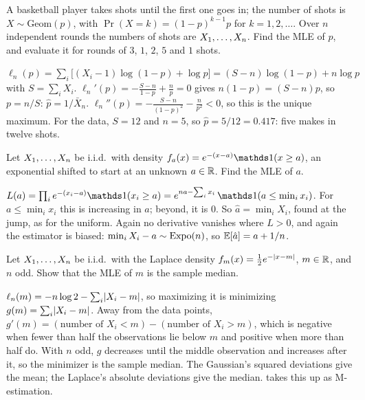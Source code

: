 \begin{exercise}
\label{ex:lik-geometric}
A basketball player takes shots until the first one goes in; the number of shots is $X \sim \text{Geom}(p)$, with $\Pr(X = k) = (1 - p)^{k-1}p$ for $k = 1, 2, \ldots$. Over $n$ independent rounds the numbers of shots are $X_1, \ldots, X_n$. Find the MLE of $p$, and evaluate it for rounds of $3$, $1$, $2$, $5$ and $1$ shots.
\end{exercise}
\begin{solution}
$\ell_n(p) = \sum_i\big[(X_i - 1)\log(1 - p) + \log p\big] = (S - n)\log(1 - p) + n\log p$ with $S = \sum_i X_i$. $\ell_n'(p) = -\frac{S - n}{1 - p} + \frac{n}{p} = 0$ gives $n(1 - p) = (S - n)p$, so $p = n/S$: $\hat{p} = 1/\bar{X}_n$. $\ell_n''(p) = -\frac{S - n}{(1-p)^2} - \frac{n}{p^2} < 0$, so this is the unique maximum. For the data, $S = 12$ and $n = 5$, so $\hat{p} = 5/12 = 0.417$: five makes in twelve shots.
\end{solution}

\begin{exercise}
\label{ex:lik-shifted-expo}
Let $X_1, \ldots, X_n$ be i.i.d.\ with density $f_a(x) = e^{-(x - a)}\ind(x \geq a)$, an exponential shifted to start at an unknown $a \in \mathbb{R}$. Find the MLE of $a$.
\end{exercise}
\begin{solution}
$L(a) = \prod_i e^{-(x_i - a)}\ind(x_i \geq a) = e^{na - \sum_i x_i}\,\ind(a \leq \min_i x_i)$. For $a \leq \min_i x_i$ this is increasing in $a$; beyond, it is $0$. So $\hat{a} = \min_i X_i$, found at the jump, as for the uniform. Again no derivative vanishes where $L > 0$, and again the estimator is biased: $\min_i X_i - a \sim \text{Expo}(n)$, so $\operatorname*{\mathbb{E}}[\hat{a}] = a + 1/n$.
\end{solution}

\begin{exercise}
\label{ex:lik-laplace}
Let $X_1, \ldots, X_n$ be i.i.d.\ with the Laplace density $f_m(x) = \frac12 e^{-\lvert x - m\rvert}$, $m \in \mathbb{R}$, and $n$ odd. Show that the MLE of $m$ is the sample median.
\end{exercise}
\begin{solution}
$\ell_n(m) = -n\log 2 - \sum_i\lvert X_i - m\rvert$, so maximizing it is minimizing $g(m) = \sum_i \lvert X_i - m\rvert$. Away from the data points, $g'(m) = (\text{number of } X_i < m) - (\text{number of } X_i > m)$, which is negative when fewer than half the observations lie below $m$ and positive when more than half do. With $n$ odd, $g$ decreases until the middle observation and increases after it, so the minimizer is the sample median. The Gaussian's squared deviations give the mean; the Laplace's absolute deviations give the median.  takes this up as M-estimation.
\end{solution}

